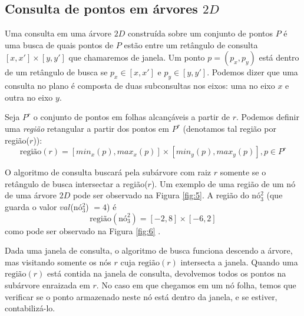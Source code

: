 \subsection{Consulta de pontos em árvores $2D$}

Uma consulta em uma árvore $2D$ construída sobre um conjunto de pontos $P$ é uma busca de quais pontos de $P$ estão entre um retângulo de consulta
\([x,x']  \times  [y,y']\) que chamaremos de janela. Um ponto $p = (p_x, p_y)$ está dentro de um retângulo de busca se $p_x \in [x, x'] \textrm{ e } p_y \in [y, y']$. Podemos dizer que uma consulta no plano é composta de duas subconsultas nos eixos: uma no eixo $x$ e outra no eixo $y$.


Seja $P^r$ o conjunto de pontos em folhas alcançáveis a partir de $r$. Podemos definir uma \emph{região} retangular a partir dos pontos em $P^r$ (denotamos tal região por região($r$)): %
$$
 \mbox{região}(r) = [min_x(p) , max_x(p) ] \times [min_y(p), max_y(p)], p \in P^r
$$

O algoritmo de consulta buscará pela subárvore com raiz \(r\) somente se o retângulo de busca intersectar a região($r$). Um exemplo de uma região de um nó de uma árvore $2D$ pode ser observado na Figura \ref{fig:5}. A região do nó$^2_3$ (que guarda o valor $val$(nó$^2_3$) $= 4$) é
$$
\mbox{região}(\mbox{nó}^2_3) =  [-2, 8] \times [-6, 2]
$$ como pode ser observado na Figura \ref{fig:6} .

Dada uma janela de consulta, o algoritmo de busca funciona descendo a árvore, mas visitando somente os nós $r$ cuja
\(\mbox{região}(r)\) intersecta a janela. Quando uma \(\mbox{região}(r)\) está contida na janela de consulta, devolvemos todos os pontos na subárvore enraizada em $r$. No caso em que chegamos em um nó folha, temos que verificar se o ponto armazenado neste nó está dentro da janela, e se estiver, contabilizá-lo.


